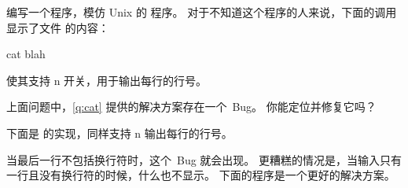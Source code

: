 \begin{Exercise}[title={Cat},difficulty=1]
\label{ex:cat}
\Question \label{ex:cat q1} 编写一个程序，模仿 Unix 的  程序。
对于不知道这个程序的人来说，下面的调用显示了文件  的内容：
\begin{display}
\pr cat blah
\end{display}

\Question 使其支持 \-n 开关，用于输出每行的行号。

\Question 上面问题中，\ref{q:cat} 提供的解决方案存在一个~Bug。
你能定位并修复它吗？
\end{Exercise}

\begin{Answer}
\Question 下面是  的实现，同样支持 \-n 输出每行的行号。
\label{q:cat}

\showremarks

\Question 当最后一行不包括换行符时，这个~Bug 就会出现。
更糟糕的情况是，当输入只有一行且没有换行符的时候，什么也不显示。
下面的程序是一个更好的解决方案。

\end{Answer}
